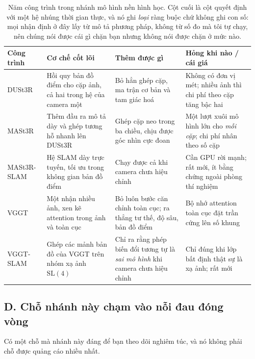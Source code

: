 \documentclass[../../deep_learning.tex]{subfiles}
\begin{document}
\begin{table}[H]\centering\footnotesize
\caption{Năm công trình trong nhánh mô hình nền hình học. Cột cuối là cột quyết định với một hệ nhúng thời gian thực, và nó ghi \emph{loại} ràng buộc chứ không ghi con số: mọi nhận định ở đây lấy từ mô tả phương pháp, không từ số đo mà tôi tự chạy, nên chúng nói được cái gì chặn bạn nhưng không nói được chặn ở mức nào.}
\label{tab:f30-nen}
\begin{tabularx}{\linewidth}{@{}L{2.0cm}YL{2.7cm}L{3.3cm}@{}}
\toprule
\textbf{Công trình} & \textbf{Cơ chế cốt lõi} & \textbf{Thêm được gì} & \textbf{Hỏng khi nào / cái giá}\\
\midrule
DUSt3R & Hồi quy bản đồ điểm cho cặp ảnh, cả hai trong hệ của camera một & Bỏ hẳn ghép cặp, ma trận cơ bản và tam giác hoá & Không có đơn vị mét; nhiều ảnh thì chi phí theo cặp tăng bậc hai\\
MASt3R & Thêm đầu ra mô tả dày và ghép tương hỗ nhanh lên DUSt3R & Ghép cặp neo trong ba chiều, chịu được góc nhìn cực đoan & Một lượt xuôi mô hình lớn cho \emph{mỗi cặp}; chi phí nhân theo số cặp\\
MASt3R-SLAM & Hệ SLAM dày trực tuyến, tối ưu trong không gian bản đồ điểm & Chạy được cả khi camera chưa hiệu chỉnh & Cần GPU rời mạnh; rất mới, ít bằng chứng ngoài phòng thí nghiệm\\
VGGT & Một  nhận nhiều ảnh, xen kẽ attention trong ảnh và toàn cục & Bỏ luôn bước căn chỉnh toàn cục; ra thẳng tư thế, độ sâu, bản đồ điểm & Bộ nhớ attention toàn cục đặt trần cứng lên số khung\\
VGGT-SLAM & Ghép các mảnh bản đồ của VGGT trên nhóm xạ ảnh \(\mathrm{SL}(4)\) & Chỉ ra rằng phép biến đổi tương tự là \emph{sai mô hình} khi camera chưa hiệu chỉnh & Chỉ đúng khi lớp bất định thật sự là xạ ảnh; rất mới\\
\bottomrule
\end{tabularx}
\end{table}

\subsection{D. Chỗ nhánh này chạm vào nỗi đau đóng vòng}
Có một chỗ mà nhánh này đáng để bạn theo dõi nghiêm túc, và nó không phải chỗ được quảng cáo nhiều nhất.
\end{document}
